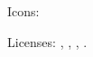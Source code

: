 \documentclass{article}
\begin{document}
Icons: \ccLogo\ \ccAttribution\ \ccShareAlike\ \ccNoDerivatives\ \ccNonCommercial\ \ccNonCommercialEU\
\ccNonCommercialJP\ \ccPublicDomain\ \ccZero\ \ccSampling\ \ccShare\ \ccRemix\ \ccCopy\ \ccPublicDomainAlt

Licenses: \ccby, \ccbyncsa, \cczero, \ccbysa.
\end{document}
